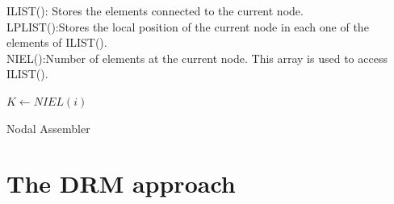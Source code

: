 \noindent
ILIST(): Stores the elements connected to the current node.\\
LPLIST():Stores the local position of the current node in each one of the elements of ILIST().\\
NIEL():Number of elements at the current node. This array is used to access ILIST().\\


\begin{algorithm}[H]
\SetAlgoLined
{}
{
$K\leftarrow NIEL(i)$
}
\caption{Nodal Assembler}
\end{algorithm}


\section{The DRM approach}





